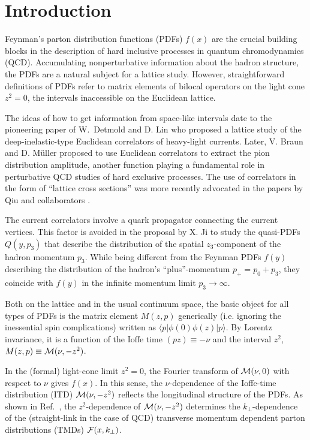 \documentclass[aps,prd,twocolumn,showpacs,preprintnumbers,superscriptaddress]{revtex4-1}
\begin{document}
   
\section{ Introduction}


Feynman's parton distribution functions (PDFs) \cite{Feynman:1973xc}  $f(x)$ 
are  the crucial building blocks in the description of hard inclusive processes 
in quantum chromodynamics (QCD).
Accumulating nonperturbative  information about 
the hadron structure,   the PDFs  are a natural subject for 
a lattice study. 
 However, straightforward definitions of  PDFs 
refer to    matrix elements
of bilocal operators on   the light cone $z^2=0$,
the intervals inaccessible on   the   Euclidean lattice.

The ideas of how to    get  information  from space-like intervals 
date to the pioneering paper of  \mbox{W. Detmold}   and D. Lin 
\cite{Detmold:2005gg}  who proposed a   lattice study 
of  the deep-inelastic-type Euclidean correlators   of heavy-light  currents.
Later, V. Braun and D. M\"uller 
\cite{Braun:2007wv}
proposed to use   Euclidean correlators to
extract  the pion 
distribution amplitude,
another   function \cite{Radyushkin:1977gp} playing a fundamental role in  perturbative QCD studies 
of  hard exclusive processes. 
The use of correlators in the form of ``lattice cross sections''  was more recently 
  advocated in the papers
by Qiu and collaborators \cite{Ma:2014jla,Ma:2017pxb}.

The current correlators involve a quark propagator connecting the current vertices.
This factor is avoided in   the  proposal   by X. Ji   \cite{Ji:2013dva}  to study  the 
quasi-PDFs $Q(y,p_3)$  that describe the  distribution
of the spatial $z_3$-component of the hadron momentum $p_3$.
While being different from the Feynman PDFs $f(y)$ describing the distribution
of the hadron's ``plus''-momentum $p_+=p_0+p_3$,
they  coincide with  $f(y)$ in  the infinite momentum limit
$p_3\to \infty$. 

Both on the lattice and in the usual continuum space,
the basic object for all types of PDFs is the 
matrix element $M(z,p)$ generically 
(i.e. ignoring the inessential spin complications)
 written as $\langle  p | \phi (0)  \phi(z)  | p \rangle $.
 By Lorentz invariance, it is a function of the 
 Ioffe time $(pz)\equiv -\nu$ \cite{Ioffe:1969kf} and the interval $z^2$,
 $M(z,p) \equiv {\cal M} (\nu, -z^2)$.
 
 In the (formal)  light-cone  limit $z^2=0$, the Fourier transform
 of  $ {\cal M} (\nu, 0)$ with respect to $\nu$ 
 gives $f(x)$.  In this sense, the $\nu$-dependence of 
 the Ioffe-time distribution (ITD) ${\cal M} (\nu, -z^2)$ reflects 
 the longitudinal structure of the PDFs.
 As shown in \mbox{Ref. \cite{Radyushkin:2016hsy}}, 
 the \mbox{$z^2$-dependence}  of  ${\cal M} (\nu, -z^2)$ determines
 the \mbox{$k_\perp$-dependence}  of the  (straight-link in the case of QCD) 
  transverse momentum dependent
 parton distributions (TMDs) ${\cal F} (x, k_\perp)$. 
 
\end{document}
